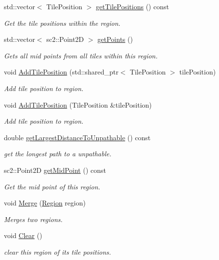 \begin{DoxyCompactItemize}
std\+::vector$<$ Tile\+Position $>$ \hyperlink{classOverseer_1_1Region_a142e51e3b9a2e4a7a6032f40372a404a}{get\+Tile\+Positions} () const 
\begin{DoxyCompactList}\small\item\em Get the tile positions within the region. \end{DoxyCompactList}\item 
std\+::vector$<$ sc2\+::\+Point2D $>$ \hyperlink{classOverseer_1_1Region_ade8829df8e820c9b72c647124876c609}{get\+Points} ()
\begin{DoxyCompactList}\small\item\em Gets all mid points from all tiles within this region. \end{DoxyCompactList}\item 
void \hyperlink{classOverseer_1_1Region_afcaa70e448891547ef6fd62a259c2408}{Add\+Tile\+Position} (std\+::shared\+\_\+ptr$<$ Tile\+Position $>$ tile\+Position)
\begin{DoxyCompactList}\small\item\em Add tile position to region. \end{DoxyCompactList}\item 
void \hyperlink{classOverseer_1_1Region_af770c2a14f8374bf4e5aaa6d9b7f8a4f}{Add\+Tile\+Position} (Tile\+Position \&tile\+Position)
\begin{DoxyCompactList}\small\item\em Add tile position to region. \end{DoxyCompactList}\item 
double \hyperlink{classOverseer_1_1Region_a25b4ea47336ca35c9bdbe557c27575a4}{get\+Largest\+Distance\+To\+Unpathable} () const 
\begin{DoxyCompactList}\small\item\em get the longest path to a unpathable. \end{DoxyCompactList}\item 
sc2\+::\+Point2D \hyperlink{classOverseer_1_1Region_a84817e4b71bd078d55124ba6a2817a74}{get\+Mid\+Point} () const 
\begin{DoxyCompactList}\small\item\em Get the mid point of this region. \end{DoxyCompactList}\item 
void \hyperlink{classOverseer_1_1Region_af1d0842a7f894786baa4a5af469b608d}{Merge} (\hyperlink{classOverseer_1_1Region}{Region} region)
\begin{DoxyCompactList}\small\item\em Merges two regions. \end{DoxyCompactList}\item 
void \hyperlink{classOverseer_1_1Region_aff2d0229f2943c243d1a28f4e3c85a06}{Clear} ()\hypertarget{classOverseer_1_1Region_aff2d0229f2943c243d1a28f4e3c85a06}{}\label{classOverseer_1_1Region_aff2d0229f2943c243d1a28f4e3c85a06}

\begin{DoxyCompactList}\small\item\em clear this region of its tile positions. \end{DoxyCompactList}\end{DoxyCompactItemize}


